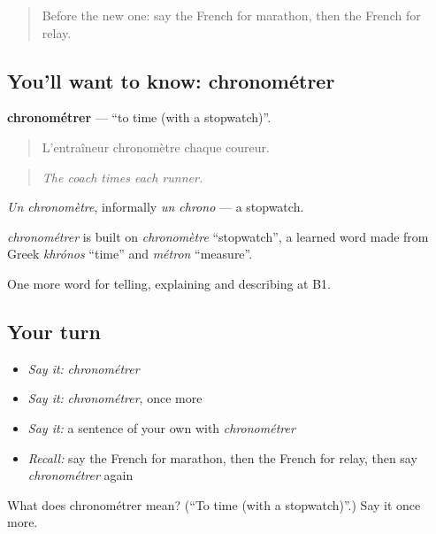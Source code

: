 \label{lesson:FR-C508-chronometrer}



\begin{quote}
Before the new one: say the French for marathon, then the French for relay.
\end{quote}

\subsection*{You'll want to know: chronométrer}
\textbf{chronométrer} — \textquotedblleft{}to time (with a stopwatch)\textquotedblright{}.

\begin{quote}
L'entraîneur chronomètre chaque coureur.
\end{quote}

\begin{quote}
\emph{The coach times each runner.}
\end{quote}

\emph{Un chronomètre}, informally \emph{un chrono} — a stopwatch.

\begin{cousinweb}
\emph{chronométrer} is built on \emph{chronomètre} \textquotedblleft{}stopwatch\textquotedblright{}, a learned word made from Greek \emph{khrónos} \textquotedblleft{}time\textquotedblright{} and \emph{métron} \textquotedblleft{}measure\textquotedblright{}.
\end{cousinweb}

\begin{grammarlens}[title={What you've built}]
One more word for telling, explaining and describing at B1.
\end{grammarlens}

\subsection*{Your turn}
\begin{itemize}
\raggedright
  \item \emph{Say it:} \emph{chronométrer}
  \item \emph{Say it:} \emph{chronométrer}, once more
  \item \emph{Say it:} a sentence of your own with \emph{chronométrer}
  \item \emph{Recall:} say the French for marathon, then the French for relay, then say \emph{chronométrer} again
\end{itemize}

\begin{tcolorbox}[breakable,colback=teal!4,colframe=teal!35!black,title={Before you move on}]
What does chronométrer mean? (\textquotedblleft{}To time (with a stopwatch)\textquotedblright{}.) Say it once more.
\end{tcolorbox}

